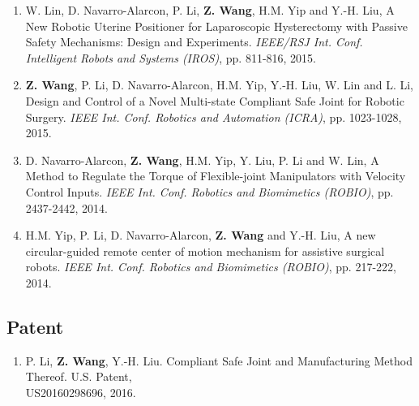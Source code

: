 \documentclass[10pt,letterpaper]{article}
\begin{document}
\begin{enumerate}
    \item W. Lin, D. Navarro-Alarcon, P. Li, \textbf{Z. Wang}, H.M. Yip and Y.-H. Liu,
    A New Robotic Uterine Positioner for Laparoscopic Hysterectomy with Passive Safety Mechanisms: Design and Experiments.
    \textit{{IEEE/RSJ} Int. Conf. Intelligent Robots and Systems (IROS)}, pp. 811-816, 2015.
    \item \textbf{Z. Wang}, P. Li, D. Navarro-Alarcon, H.M. Yip, Y.-H. Liu, W. Lin and L. Li,
    Design and Control of a Novel Multi-state Compliant Safe Joint for Robotic Surgery.
    \textit{{IEEE} Int. Conf. Robotics and Automation (ICRA)}, pp. 1023-1028, 2015.
    \item D. Navarro-Alarcon, \textbf{Z. Wang}, H.M. Yip, Y. Liu, P. Li and W. Lin,
    A Method to Regulate the Torque of Flexible-joint Manipulators with Velocity Control Inputs.
    \textit{{IEEE} Int. Conf. Robotics and Biomimetics (ROBIO)}, pp. 2437-2442, 2014.
    \item H.M. Yip, P. Li, D. Navarro-Alarcon, \textbf{Z. Wang} and Y.-H. Liu,
    A new circular-guided remote center of motion mechanism for assistive surgical robots.
    \textit{{IEEE} Int. Conf. Robotics and Biomimetics (ROBIO)}, pp. 217-222, 2014.
\end{enumerate}

\subsection*{Patent}
\begin{enumerate}
    \item P. Li, \textbf{Z. Wang}, Y.-H. Liu.
    Compliant Safe Joint and Manufacturing Method Thereof.
    U.S. Patent, \\US20160298696, 2016.
\end{enumerate}

\end{document}

